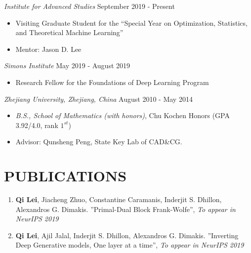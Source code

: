 \documentclass[margin, 10pt]{res} %
\begin{document}
\begin{resume}
{\sl Institute for Advanced Studies} \hfill September 2019 - Present 
\begin{itemize}
  \item Visiting Graduate Student for the ``Special Year on Optimization, Statistics, and Theoretical Machine Learning''
  \item Mentor: Jason D. Lee
\end{itemize}

{\sl Simons Institute} \hfill May 2019 - August 2019
\begin{itemize}
  \item Research Fellow for the Foundations of Deep Learning Program
\end{itemize}



{\sl Zhejiang University, Zhejiang, China} \hfill August 2010 - May 2014 \begin{itemize}
  \item {\sl B.S., School of Mathematics (with honors)}, Chu Kochen Honors (GPA 3.92/4.0, rank $1^{st}$)
  \item Advisor: Qunsheng Peng, State Key Lab of CAD\&CG.
\end{itemize}

\section{PUBLICATIONS}
\begin{enumerate}
  \item{ \textbf{Qi Lei}, Jiacheng Zhuo, Constantine Caramanis, Inderjit S. Dhillon, Alexandros G. Dimakis. ''Primal-Dual Block Frank-Wolfe'', \textit{To appear in NeurIPS 2019} }
  \item{ \textbf{Qi Lei}, Ajil Jalal, Inderjit S. Dhillon, Alexandros G. 
      Dimakis. ''Inverting Deep Generative models, One layer at a time'', 
    \textit{To appear in NeurIPS 2019} }


\end{enumerate}
\end{resume}
\end{document}
